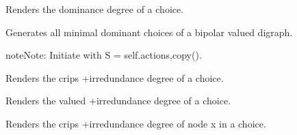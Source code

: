 \documentclass[letterpaper,10pt,english]{sphinxmanual}
\begin{document}
\begin{fulllineitems}
\begin{fulllineitems}
\end{fulllineitems}


\begin{fulllineitems}
\label{techDoc:digraphs.Digraph.domin}
Renders the dominance degree of a choice.

\end{fulllineitems}


\begin{fulllineitems}
\label{techDoc:digraphs.Digraph.dominantChoices}
Generates all minimal dominant choices of a bipolar valued digraph.

\begin{notice}{note}{Note:}
Initiate with S = self.actions,copy().
\end{notice}

\end{fulllineitems}


\begin{fulllineitems}
\label{techDoc:digraphs.Digraph.domirred}
Renders the crips +irredundance degree of a choice.

\end{fulllineitems}


\begin{fulllineitems}
\label{techDoc:digraphs.Digraph.domirredval}
Renders the valued +irredundance degree of a choice.

\end{fulllineitems}


\begin{fulllineitems}
\label{techDoc:digraphs.Digraph.domirredx}
Renders the crips +irredundance degree of node x in a choice.

\end{fulllineitems}


\end{fulllineitems}
\end{document}
